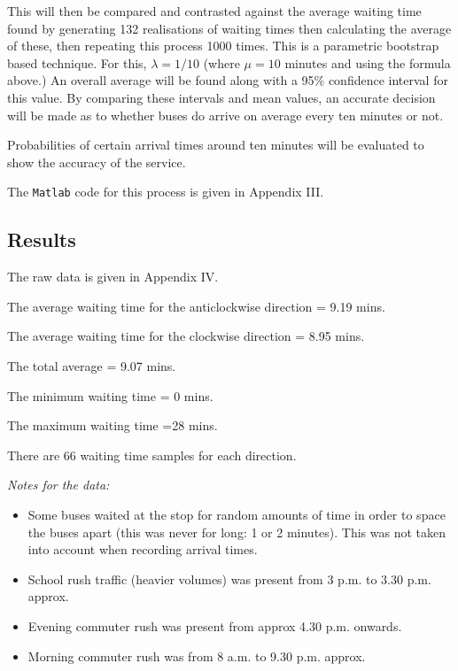 This will then be compared and contrasted against the average waiting time found by generating 132 realisations of waiting times then calculating the average of these, then repeating this process 1000 times. This is a parametric bootstrap based technique. For this, $\lambda=1/10$ (where $\mu=10$ minutes and using the formula above.) An overall average will be found along with a 95\% confidence interval for this value. By comparing these intervals and mean values, an accurate decision will be made as to whether buses do arrive on average every ten minutes or not.

Probabilities of certain arrival times around ten minutes will be evaluated to show the accuracy of the service. 

The {\tt Matlab} code for this process is given in Appendix III.

\subsection{Results}
The raw data is given in Appendix IV.

The average waiting time for the anticlockwise direction = 9.19 mins.

The average waiting time for the clockwise direction = 8.95 mins.

The total average = 9.07 mins.

The minimum waiting time = 0 mins.

The maximum waiting time =28 mins.

There are 66 waiting time samples for each direction.

\noindent
{\it Notes for the data:}
\begin{itemize}
    \item Some buses waited at the stop for random amounts of time in order to space the buses apart (this was never for long: 1 or 2 minutes). This was not taken into account when recording arrival times.
\item School rush traffic (heavier volumes) was present from 3 p.m. to 3.30 p.m. approx.
\item Evening commuter rush was present from approx 4.30 p.m. onwards.
\item Morning commuter rush was from 8 a.m. to 9.30 p.m. approx.
\end{itemize}

